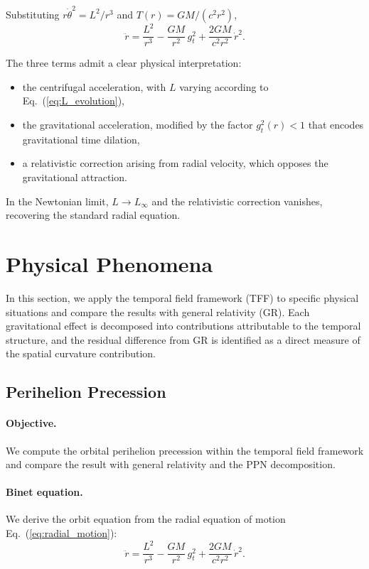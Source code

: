 \documentclass[12pt]{article}
\begin{document}
Substituting $r\dot{\theta}^2 = L^2/r^3$ and $T(r) = GM/(c^2 r^2)$,
\begin{equation}
\ddot{r} = \frac{L^2}{r^3} - \frac{GM}{r^2}\,g_t^2
         + \frac{2GM}{c^2 r^2}\,\dot{r}^2 .
\label{eq:radial_motion}
\end{equation}

The three terms admit a clear physical interpretation:
\begin{itemize}
\item the centrifugal acceleration, with $L$ varying according to Eq.~(\ref{eq:L_evolution}),
\item the gravitational acceleration, modified by the factor $g_t^2(r) < 1$ that encodes gravitational time dilation,
\item a relativistic correction arising from radial velocity, which opposes the gravitational attraction.
\end{itemize}

In the Newtonian limit, $L \to L_\infty$ and the relativistic correction vanishes, recovering the standard radial equation.


\section{Physical Phenomena}
\label{sec:phenomena}

In this section, we apply the temporal field framework (TFF) to specific physical situations and compare the results with general relativity (GR). Each gravitational effect is decomposed into contributions attributable to the temporal structure, and the residual difference from GR is identified as a direct measure of the spatial curvature contribution.

\subsection{Perihelion Precession}
\label{sec:precession}

\paragraph{Objective.}
We compute the orbital perihelion precession within the temporal field framework and compare the result with general relativity and the PPN decomposition.

\paragraph{Binet equation.}
We derive the orbit equation from the radial equation of motion Eq.~(\ref{eq:radial_motion}):
$$
\ddot{r} = \frac{L^2}{r^3} - \frac{GM}{r^2}\,g_t^2
         + \frac{2GM}{c^2 r^2}\,\dot{r}^2 .
$$
\end{document}
